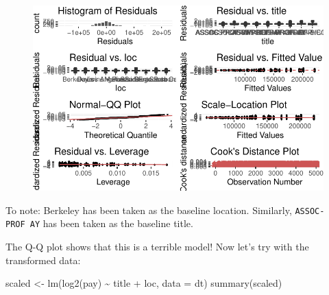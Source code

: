 \documentclass[
  letterpaper,
  DIV=11,
  numbers=noendperiod]{scrreprt}
\newenvironment{Shaded}{\begin{snugshade}}{\end{snugshade}}
\newcommand{\AttributeTok}[1]{\textcolor[rgb]{0.40,0.45,0.13}{#1}}
\newcommand{\FunctionTok}[1]{\textcolor[rgb]{0.28,0.35,0.67}{#1}}
\newcommand{\NormalTok}[1]{\textcolor[rgb]{0.00,0.23,0.31}{#1}}
\newcommand{\OtherTok}[1]{\textcolor[rgb]{0.00,0.23,0.31}{#1}}
\newcommand{\SpecialCharTok}[1]{\textcolor[rgb]{0.37,0.37,0.37}{#1}}
\begin{document}
\begin{figure}[H]

{\centering \includegraphics{./08-linearreg_files/figure-pdf/unnamed-chunk-34-1.pdf}

}

\end{figure}

To note: Berkeley has been taken as the baseline location. Similarly,
\texttt{ASSOC-PROF\ AY} has been taken as the baseline title.

The Q-Q plot shows that this is a terrible model! Now let's try with the
transformed data:

\begin{Shaded}
\begin{Highlighting}[]
\NormalTok{scaled }\OtherTok{\textless{}{-}} \FunctionTok{lm}\NormalTok{(}\FunctionTok{log2}\NormalTok{(pay) }\SpecialCharTok{\textasciitilde{}}\NormalTok{ title }\SpecialCharTok{+}\NormalTok{ loc, }\AttributeTok{data =}\NormalTok{ dt)}
\FunctionTok{summary}\NormalTok{(scaled)}
\end{Highlighting}
\end{Shaded}
\end{document}

